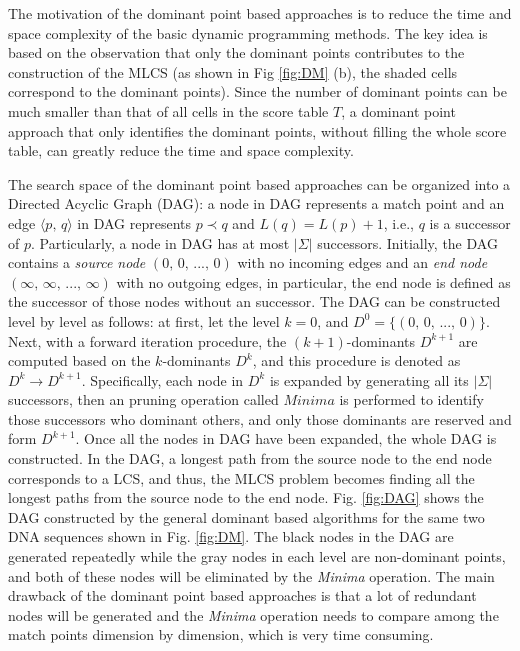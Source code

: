 \documentclass{article}
\begin{document}
The motivation of the dominant point based approaches is to reduce the
time and space complexity of the basic dynamic programming
methods. The key idea is based on the observation that only the
dominant points contributes to the construction of the MLCS (as shown
in Fig \ref{fig:DM} (b), the shaded cells correspond to the dominant
points).  Since the number of dominant points can be much smaller than
that of all cells in the score table $T$, a dominant point approach
that only identifies the dominant points, without filling the whole
score table, can greatly reduce the time and space complexity.

The search space of the dominant point based approaches can be
organized into a Directed Acyclic Graph (DAG): a node in DAG
represents a match point and an edge $\langle p,\, q \rangle$ in DAG
represents $p \prec q$ and $L(q) = L(p) + 1$, i.e., $q$ is a successor
of $p$. Particularly, a node in DAG has at most $|\Sigma|$
successors. Initially, the DAG contains a \emph{source node}
$(0,\, 0,\, ...,\, 0)$ with no incoming edges and an \emph{end node}
$(\infty,\, \infty,\, ...,\, \infty)$ with no outgoing edges, in
particular, the end node is defined as the successor of those nodes
without an successor. The DAG can be constructed level by level as
follows: at first, let the level $k = 0$, and
$D^0 = \{(0,\, 0,\, ...,\, 0)\}$. Next, with a forward iteration
procedure, the $(k+1)$-dominants $D^{k+1}$ are computed based on the
$k$-dominants $D^k$, and this procedure is denoted as
$D^k \rightarrow D^{k+1}$. Specifically, each node in $D^k$ is
expanded by generating all its $|\Sigma|$ successors, then an pruning
operation called $Minima$ is performed to identify those successors
who dominant others, and only those dominants are reserved and form
$D^{k+1}$. Once all the nodes in DAG have been expanded, the whole DAG
is constructed. In the DAG, a longest path from the source node to the
end node corresponds to a LCS, and thus, the MLCS problem becomes
finding all the longest paths from the source node to the end node.
Fig.  \ref{fig:DAG} shows the DAG constructed by the general dominant
based algorithms for the same two DNA sequences shown in
Fig. \ref{fig:DM}. The black nodes in the DAG are generated repeatedly
while the gray nodes in each level are non-dominant points, and both
of these nodes will be eliminated by the \emph{Minima} operation. The
main drawback of the dominant point based approaches is that a lot of
redundant nodes will be generated and the \emph{Minima} operation
needs to compare among the match points dimension by dimension, which
is very time consuming.
\end{document}
